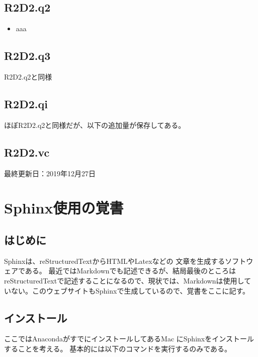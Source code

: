 \documentclass[letterpaper,10pt,dvipdfmx,report]{sphinxmanual}
\begin{document}
\section{R2D2.q2}
\label{\detokenize{notation:r2d2-q2}}\begin{itemize}
\item {} 
aaa

\end{itemize}


\section{R2D2.q3}
\label{\detokenize{notation:r2d2-q3}}
R2D2.q2と同様


\section{R2D2.qi}
\label{\detokenize{notation:r2d2-qi}}
ほぼR2D2.q2と同様だが、以下の追加量が保存してある。


\section{R2D2.vc}
\label{\detokenize{notation:r2d2-vc}}
最終更新日：2019年12月27日


\chapter{Sphinx使用の覚書}
\label{\detokenize{sphinx:sphinx}}\label{\detokenize{sphinx::doc}}

\section{はじめに}
\label{\detokenize{sphinx:id1}}
Sphinxは、reStructuredTextからHTMLやLatexなどの
文章を生成するソフトウェアである。
最近ではMarkdownでも記述できるが、結局最後のところはreStructuredTextで記述することになるので、現状では、Markdownは使用していない。このウェブサイトもSphinxで生成しているので、覚書をここに記す。


\section{インストール}
\label{\detokenize{sphinx:id3}}
ここではAnacondaがすでにインストールしてあるMac
にSphinxをインストールすることを考える。
基本的には以下のコマンドを実行するのみである。
\end{document}

